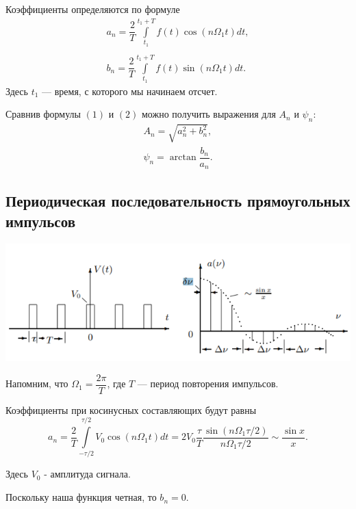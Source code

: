 Коэффициенты определяются по формуле
    \begin{equation}
    \begin{array}{c}
    a_n  = \dfrac{2}{T}\int\limits_{t_1}^{t_1+T}f(t)\cos\left(n \Omega_1 t\right) dt,\\
    \\
    b_n = \dfrac{2}{T}\int\limits_{t_1}^{t_1+T}f(t)\sin\left(n \Omega_1 t\right) dt.
    \end{array}
    \end{equation}
Здесь $t_1$ --- время, с которого мы начинаем отсчет.

Сравнив формулы $(1)$ и $(2)$ можно получить выражения для $A_n$  и $\psi_n$:
    \begin{equation}
    \begin{array}{l}
    A_n = \sqrt{a_n^2+b_n^2},\\
     \psi_n = \arctan \dfrac{b_n}{a_n}.
    \end{array}
    \end{equation}
\subsection*{Периодическая последовательность прямоугольных импульсов}
    \begin{center}
    \includegraphics[scale=0.9]{images/2.png}
    \end{center}
Напомним, что $\Omega_1 = \dfrac{2\pi}{T}$,
где $T$ --- период повторения импульсов.

Коэффициенты при косинусных составляющих будут равны
    \begin{equation}
    a_n = \dfrac{2}{T}\int\limits_{-\tau/2}^{\tau/2}V_0\cos\left(n\Omega_1 t\right)dt = 2V_0\dfrac{\tau}{T}\dfrac{\sin\left(n\Omega_1\tau/2\right)}{n\Omega_1\tau/2} \sim \dfrac{\sin x}{x}.
    \end{equation}

Здесь $V_0$ - амплитуда сигнала.

Поскольку наша функция четная, то $b_n = 0$. 

